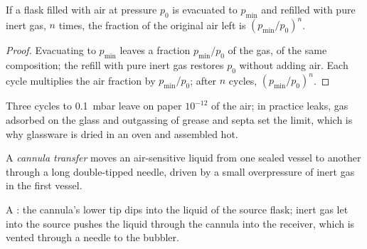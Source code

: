 \begin{proposition}\label{prop:b3:lab-techniques-3:purge-cycles}
If a flask filled with air at pressure $p_0$ is evacuated to $p_{\min}$ and refilled with
pure inert gas, $n$ times, the fraction of the original air left is $(p_{\min}/p_0)^n$.
\end{proposition}

\begin{proof}
Evacuating to $p_{\min}$ leaves a fraction $p_{\min}/p_0$ of the gas, of the same composition; the
refill with pure inert gas restores $p_0$ without adding air. Each cycle multiplies the
air fraction by $p_{\min}/p_0$; after $n$ cycles, $(p_{\min}/p_0)^n$.
\end{proof}

Three cycles to \qty{0.1}{mbar} leave on paper $10^{-12}$ of the air; in practice leaks, gas
adsorbed on the glass and outgassing of grease and septa set the limit, which is
why glassware is dried in an oven and assembled hot.

\begin{definition}\label{def:b3:lab-techniques-3:cannula}
A \emph{cannula transfer} moves an air-sensitive liquid
from one sealed vessel to another through a long double-tipped needle, driven
by a small overpressure of inert gas in the first vessel.
\end{definition}

\begin{omfigure}

{\small A : the cannula's lower tip dips into the liquid of the
source flask; inert gas let into the source pushes the liquid through the
cannula into the receiver, which is vented through a needle to the bubbler.}
\end{omfigure}

